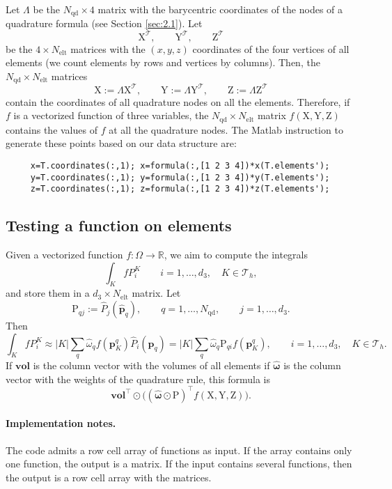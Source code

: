 \documentclass[10pt,english]{article}
\newcommand{\Nelt}{{N_{\mathrm{elt}}}}
\newcommand{\Nnd}{{N_{\mathrm{qd}}}}
\begin{document}
Let $\Lambda$ be the $\Nnd\times 4$ matrix with the barycentric coordinates of the nodes of a quadrature formula (see Section \ref{sec:2.1}). Let 
\[
\mathrm X^{\mathcal T}, \qquad \mathrm Y^{\mathcal T}, \qquad \mathrm Z^{\mathcal T}
\]
be the $4\times \Nelt $ matrices with the $(x,y,z)$ coordinates of the four vertices of all elements (we count elements by rows and vertices by columns). Then, the $\Nnd\times \Nelt$ matrices
\[
\mathrm X:=\Lambda \mathrm X^{\mathcal T} , \qquad \mathrm Y:=\Lambda \mathrm Y^{\mathcal T} , \qquad \mathrm Z:=\Lambda \mathrm Z^{\mathcal T}
\]
contain the coordinates of all quadrature nodes on all the elements. Therefore, if $f$ is a vectorized function of three variables, the $\Nnd\times \Nelt$ matrix $f(\mathrm X,\mathrm Y,\mathrm Z)$ contains the values of $f$ at all the quadrature nodes. The Matlab instruction to generate these points based on our data structure are:
\begin{verbatim}
     x=T.coordinates(:,1); x=formula(:,[1 2 3 4])*x(T.elements');
     y=T.coordinates(:,1); y=formula(:,[1 2 3 4])*y(T.elements');
     z=T.coordinates(:,1); z=formula(:,[1 2 3 4])*z(T.elements');
\end{verbatim}





\subsection{Testing a function on elements}\label{sec:3.4}

Given a vectorized function $f:\Omega\to \mathbb R$, we aim to compute the integrals
\[
\int_K f P_i^K \qquad  i=1,\ldots,d_3, \quad K\in \mathcal T_h,
\]
and store them in a $d_3\times \Nelt$ matrix. Let
\[
\mathrm P_{qj}:=\widehat P_j(\widehat{\mathbf p}_q), \qquad q=1,\ldots,\Nnd, \qquad j=1,\ldots, d_3.
\]
Then
\[
\int_K f P_i^K \approx |K|\sum_q \widehat\omega_q f(\mathbf p_K^q) \widehat P_i(\widehat{\mathbf p}_q)= |K|\sum_q \widehat\omega_q \mathrm P_{qi} f(\mathbf p_K^q),\qquad  i=1,\ldots,d_3, \quad K\in \mathcal T_h.
\]
If $\mathbf{vol}$ is the column vector with the volumes of all elements if $\widehat{\boldsymbol\omega}$ is the column vector with the weights of the quadrature rule, this formula is
\[
\mathbf{vol}^\top \odot \Big( (\widehat{\boldsymbol\omega}\odot \mathrm P)^\top f(\mathrm X,\mathrm Y,\mathrm Z)\Big).
\]

\paragraph{Implementation notes.} 
The code admits a row cell array of functions as input. If the array contains only one function, the output is a matrix. If the input contains several functions, then the output is a row cell array with the matrices.
\end{document}
